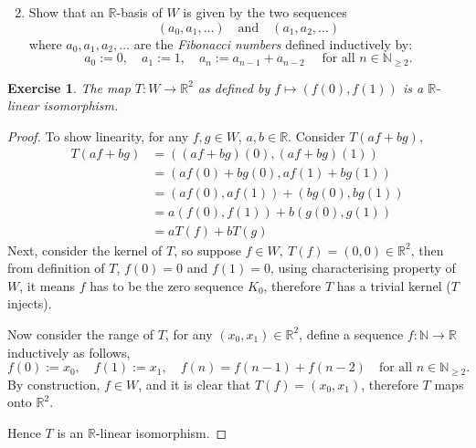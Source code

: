 \documentclass[11pt]{article}
\newtheorem{lemma}{Exercise}
\theoremstyle{definition}
\numberwithin{lemma}{problem}
\numberwithin{equation}{problem}
\newcommand{\N}{\mathbb{N}}
\newcommand{\R}{\mathbb{R}}
\renewcommand{\geq}{\geqslant}
\renewcommand{\leq}{\leqslant}
\begin{document}
\newpage
\begin{enumerate}[label=(\alph*)] \setcounter{enumi}{1}
    \item Show that an $\R$-basis of $W$ is given by the two sequences
        \[ (a_0, a_1, \dots) \quad\text{and}\quad (a_1, a_2, \dots) \]
        where $a_0, a_1, a_2, \dots$ are the \emph{Fibonacci numbers} defined inductively by:
        \[ a_0 := 0,\quad a_1:=1,\quad a_n:= a_{n-1} + a_{n-2} \quad\text{ for all } n\in\N_{\geq 2}. \]
\end{enumerate}
\begin{lemma} \label{q5_isomeme}
    The map $T: W \to \R^2$ as defined by $f \mapsto \left( f(0), f(1) \right)$ is a $\R$-linear isomorphism.
\end{lemma}
\begin{proof}
    To show linearity, for any $f,g\in W$, $a,b\in \R$.
    Consider $T(af + bg)$,
    \begin{align*}
        T(af + bg) &= \left( (af+bg)(0), (af+bg)(1) \right) \\
        &= \left( af(0)+bg(0), af(1)+bg(1) \right) \\
        &= \left( af(0), af(1)\right) + \left( bg(0), bg(1) \right)\\
        &= a\left( f(0), f(1)\right) + b\left( g(0), g(1) \right)\\
        &= aT(f) + bT(g)
    \end{align*}
    Next, consider the kernel of $T$, so suppose $f\in W,~ T(f) = (0,0)\in \R^2$,
    then from definition of $T$, $f(0) = 0$ and $f(1) = 0$, using characterising property of $W$,
    it means $f$ has to be the zero sequence $K_0$, therefore $T$ has a trivial kernel ($T$ injects).

    Now consider the range of $T$, for any $(x_0, x_1)\in \R^2$,
    define a sequence $f:\N \to \R$ inductively as follows,
    $$ f(0) := x_0,\quad f(1) := x_1,\quad f(n) = f(n-1) + f(n-2)\quad \text{for all }n \in \N_{\geq 2}. $$
    By construction, $f\in W$, and it is clear that $T(f) = (x_0, x_1)$, therefore $T$ maps onto $\R^2$.

    Hence $T$ is an $\R$-linear isomorphism.
\end{proof}
\end{document}
